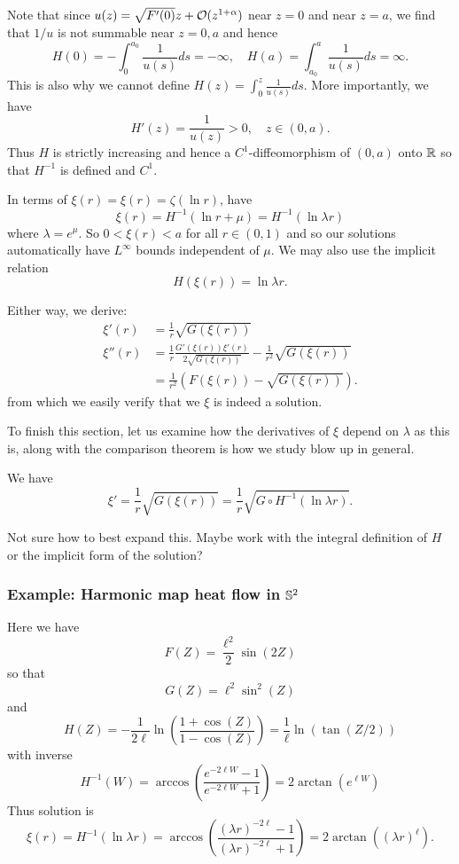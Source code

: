 \documentclass{amsart}
\begin{document}
Note that since \(u(z) = \sqrt{F'(0)} z + \bigo(z^{1 + \alpha})\) near \(z=0\) and near \(z=a\), we find that \(1/u\) is not summable near \(z = 0, a\) and hence
\[
H(0) = - \int_0^{a_0} \frac{1}{u(s)} ds = - \infty, \quad H(a) = \int_{a_0}^a \frac{1}{u(s)} ds = \infty.
\]
This is also why we cannot define \(H(z) = \int_{0}^z \frac{1}{u(s)} ds\). More importantly, we have
\[
H'(z) = \frac{1}{u(z)} > 0, \quad z \in (0, a).
\]
Thus \(H\) is strictly increasing and hence a \(C^1\)-diffeomorphism of \((0, a)\) onto \(\R\) so that \(H^{-1}\) is defined and \(C^1\).

In terms of \(\xi(r) = \xi(r) = \zeta(\ln r)\), have
\[
\xi(r) = H^{-1} (\ln r + \mu) = H^{-1} (\ln \lambda r)
\]
where \(\lambda = e^{\mu}\). So \(0 < \xi(r) < a\) for all \(r \in (0, 1)\) and so our solutions automatically have \(L^{\infty}\) bounds independent of \(\mu\). We may also use the implicit relation
\[
H (\xi(r)) =  \ln \lambda r.
\]

Either way, we derive:
\begin{align*}
\xi'(r) &= \frac{1}{r}  \sqrt{G(\xi(r))} \\
\xi''(r) &= \frac{1}{r} \frac{G'(\xi(r)) \xi'(r)}{2 \sqrt{G(\xi(r))}} - \frac{1}{r^2} \sqrt{G(\xi(r))} \\
&= \frac{1}{r^2} \left(F(\xi(r))- \sqrt{G(\xi(r))}\right).
\end{align*}
from which we easily verify that we \(\xi\) is indeed a solution.

To finish this section, let us examine how the derivatives of \(\xi\) depend on \(\lambda\) as this is, along with the comparison theorem is how we study blow up in general.

We have
\[
\xi' = \frac{1}{r}  \sqrt{G(\xi(r))} = \frac{1}{r}  \sqrt{G \circ H^{-1}(\ln \lambda r)}.
\]

{\color{red}Not sure how to best expand this. Maybe work with the integral definition of \(H\) or the implicit form of the solution?}

\subsubsection*{Example: Harmonic map heat flow in \(\S^2\)}

Here we have
\[
F(Z) = \frac{\ell^2}{2} \sin(2Z)
\]
so that
\[
G(Z) = \ell^2 \sin^2(Z)
\]
and
\[
H(Z) = -\frac{1}{2\ell} \ln \left(\frac{1+\cos(Z)}{1-\cos(Z)}\right) = \frac{1}{\ell}\ln \left(\tan(Z/2)\right)
\]
with inverse
\[
H^{-1}(W) = \arccos\left(\frac{e^{-2\ell W} - 1}{e^{-2\ell W} + 1}\right) = 2 \arctan(e^{\ell W})
\]
Thus solution is
\[
\xi(r) = H^{-1} (\ln \lambda r) = \arccos\left(\frac{(\lambda r)^{-2\ell} - 1}{(\lambda r)^{-2\ell} + 1}\right) = 2\arctan((\lambda r)^{\ell}).
\]
\end{document}
